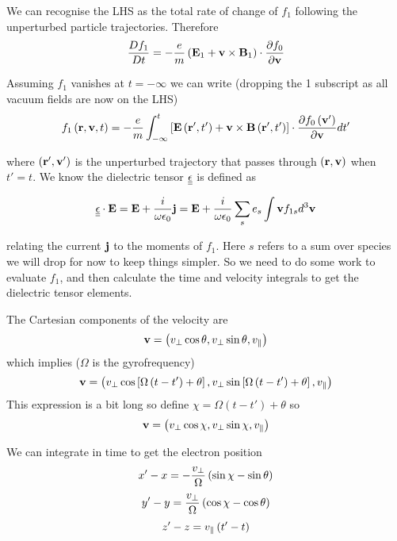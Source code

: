 We can recognise the LHS as the total rate of change of $f_1$ following the unperturbed particle trajectories. Therefore
\begin{equation}
	\frac{D f_1}{D t} = -\frac{e}{m} \left(\textbf{E}_1 + \textbf{v} \times \textbf{B}_1\right) \cdot \frac{\partial f_0}{\partial \textbf{v}}
\end{equation}

Assuming $f_1$ vanishes at $t=-\infty$ we can write (dropping the 1 subscript as all vacuum fields are now on the LHS)
\begin{equation}
	f_1 \left(\textbf{r}, \textbf{v}, t\right) = -\frac{e}{m} \int_{-\infty}^t \left[\textbf{E} \left(\textbf{r}', t'\right) + \textbf{v} \times \textbf{B}\left(\textbf{r}', t'\right) \right] \cdot \frac{\partial f_0 \left(\textbf{v}'\right)}{\partial \textbf{v}} dt'
\end{equation}

where $\left(\textbf{r}', \textbf{v}'\right)$ is the unperturbed trajectory that passes through $\left(\textbf{r}, \textbf{v}\right)$ when $t'=t$. We know the dielectric tensor $\underline{\underline{\epsilon}}$ is defined as

\begin{equation}\label{dielectric_tensor_def_kinetic_theory}
	\underline{\underline{\epsilon}}\cdot\textbf{E} = \textbf{E} + \frac{i}{\omega \epsilon_0}\textbf{j} = \textbf{E} + \frac{i}{\omega \epsilon_0} \sum_s e_s \int \textbf{v} f_{1s} d^3 \textbf{v}
\end{equation}

relating the current $\textbf{j}$ to the moments of $f_1$. Here $s$ refers to a sum over species we will drop for now to keep things simpler. So we need to do some work to evaluate $f_1$, and then calculate the time and velocity integrals to get the dielectric tensor elements.

The Cartesian components of the velocity are
\begin{equation}
	\textbf{v} = \left(v_\perp\cos\theta, v_\perp\sin\theta, v_\parallel\right)
\end{equation}
which implies ($\Omega$ is the gyrofrequency)
\begin{equation}
	\textbf{v} = \left(v_\perp\cos\left[\Omega\left(t-t'\right)+\theta\right], v_\perp\sin\left[\Omega\left(t-t'\right)+\theta\right], v_\parallel\right)
\end{equation}
This expression is a bit long so define $\chi =\Omega\left(t-t'\right)+\theta$ so
\begin{equation}
	\textbf{v} = \left(v_\perp\cos\chi, v_\perp\sin\chi, v_\parallel\right)
\end{equation}

We can integrate in time to get the electron position
\begin{equation}\label{electron_xposition}
	x'-x = -\frac{v_\perp}{\Omega}\left( \sin\chi - \sin\theta\right)
\end{equation}
\begin{equation}\label{electron_yposition}
	y'-y = \frac{v_\perp}{\Omega}\left( \cos\chi - \cos\theta\right)
\end{equation}
\begin{equation}\label{electron_zposition}
	z'-z=v_\parallel \left(t' - t\right)
\end{equation}

